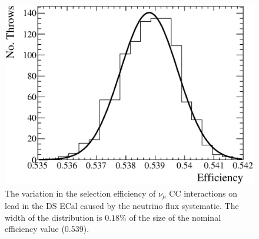 \begin{figure}
  \centering
  \includegraphics[width=12cm]{images/measurement/systematics/flux/flux_efficiency_variation.eps}
  \caption{The variation in the selection efficiency of $\nu_\mu$ CC interactions on lead in the DS ECal caused by the neutrino flux systematic.  The width of the distribution is $0.18\%$ of the size of the nominal efficiency value (0.539).}
  \label{fig:FluxEfficiencyVariation}
\end{figure}
